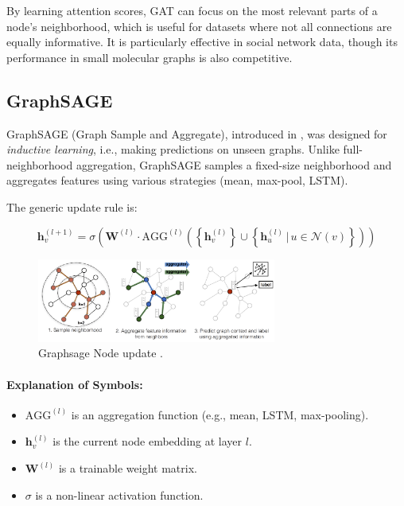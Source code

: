 \documentclass[11pt,a4paper]{article}
\begin{document}
	By learning attention scores, GAT can focus on the most relevant parts of a node's neighborhood, which is useful for datasets where not all connections are equally informative. It is particularly effective in social network data, though its performance in small molecular graphs is also competitive.
	
	\subsection{GraphSAGE}
	
	GraphSAGE (Graph Sample and Aggregate), introduced in \cite{hamilton2017inductive}, was designed for \emph{inductive learning}, i.e., making predictions on unseen graphs. Unlike full-neighborhood aggregation, GraphSAGE samples a fixed-size neighborhood and aggregates features using various strategies (mean, max-pool, LSTM).
	
	The generic update rule is:
	
	\begin{equation}
		\mathbf{h}_v^{(l+1)} = \sigma\left( \mathbf{W}^{(l)} \cdot \text{AGG}^{(l)} \left( \left\{ \mathbf{h}_v^{(l)} \right\} \cup \left\{ \mathbf{h}_u^{(l)} \, | \, u \in \mathcal{N}(v) \right\} \right) \right)
	\end{equation}

	\begin{figure}[h]
		\centering
		\includegraphics[width=0.7\textwidth]{graphsage.png}
		\caption{Graphsage Node update \cite{pic:graphsage}.}
	\end{figure}
	
	\paragraph{Explanation of Symbols:}
	\begin{itemize}
		\item $\text{AGG}^{(l)}$ is an aggregation function (e.g., mean, LSTM, max-pooling).
		\item $\mathbf{h}_v^{(l)}$ is the current node embedding at layer $l$.
		\item $\mathbf{W}^{(l)}$ is a trainable weight matrix.
		\item $\sigma$ is a non-linear activation function.
	\end{itemize}
	
\end{document}
